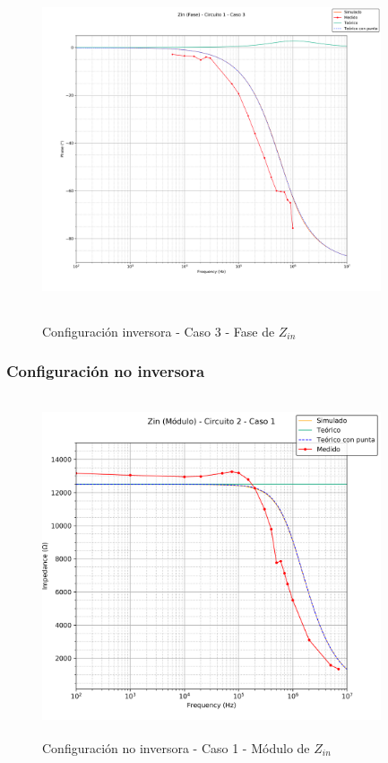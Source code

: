 \begin{figure}[H] %
	\centering
	\includegraphics[width=10cm,height=10cm,keepaspectratio]{../EJ1/00GRAFICOS/c1c3/c1c3zinFASE.png}
	\caption{Configuración inversora - Caso 3 - Fase de $Z_{in}$}
	\label{c1c3zinP}
\end{figure}

\subsubsection*{Configuraci\'on no inversora}
\begin{figure}[H] %
	\centering
	\includegraphics[width=10cm,height=10cm,keepaspectratio]{../EJ1/00GRAFICOS/c2c1/c2c1ZINpunta.png}
	\caption{Configuración no inversora - Caso 1 - M\'odulo de $Z_{in}$}
	\label{c2c1zinM}
\end{figure}

